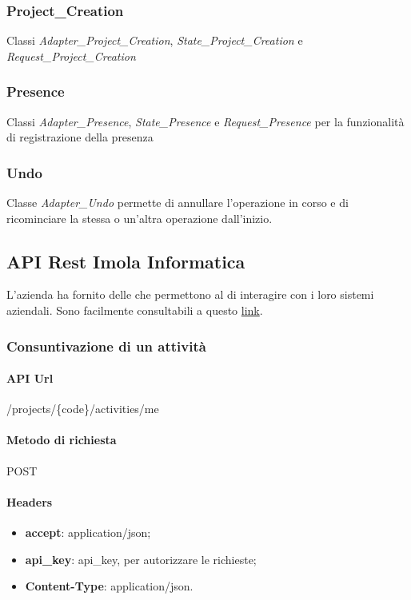 \subsubsection{Project\_Creation} Classi \textit{Adapter\_Project\_Creation}, \textit{State\_Project\_Creation} e \textit{Request\_Project\_Creation}
\subsubsection{Presence} Classi \textit{Adapter\_Presence}, \textit{State\_Presence} e \textit{Request\_Presence} per la funzionalità di registrazione della presenza
\subsubsection{Undo} Classe \textit{Adapter\_Undo} permette di annullare l'operazione in corso e di ricominciare la stessa o un'altra operazione dall'inizio.
\subsection{API Rest Imola Informatica} L'azienda ha fornito delle  che permettono al  di interagire con i loro sistemi aziendali. Sono facilmente consultabili a questo \href{https://apibot4me.imolinfo.it/}{\color{blue} link}.
\subsubsection{Consuntivazione di un attività}
\paragraph{API Url} \hfill \break
/projects/\{code\}/activities/me
\paragraph{Metodo di richiesta } \hfill \break
POST
\paragraph{Headers }
\begin{itemize}
    \item \textbf{accept}: application/json;
    \item \textbf{api\_key}: api\_key, per autorizzare le richieste;
    \item \textbf{Content-Type}: application/json.
\end{itemize}
